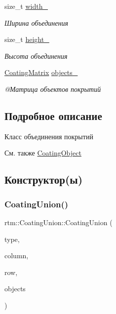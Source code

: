 \begin{DoxyCompactItemize}
size\+\_\+t \hyperlink{classrtm_1_1_coating_union_acab8ed30a66c786a3ac7d0edff914dbc}{width\+\_\+}
\begin{DoxyCompactList}\small\item\em Ширина объединения \end{DoxyCompactList}\item 
\mbox{\label{classrtm_1_1_coating_union_abd65484b95a4b62e1c22146cb2a9d542}} 
size\+\_\+t \hyperlink{classrtm_1_1_coating_union_abd65484b95a4b62e1c22146cb2a9d542}{height\+\_\+}
\begin{DoxyCompactList}\small\item\em Высота объединения \end{DoxyCompactList}\item 
\mbox{\label{classrtm_1_1_coating_union_a805afd44081afec9f4e286436be1a735}} 
\hyperlink{namespacertm_ae3bb29510cfde424975be31866d2486e}{Coating\+Matrix} \hyperlink{classrtm_1_1_coating_union_a805afd44081afec9f4e286436be1a735}{objects\+\_\+}
\begin{DoxyCompactList}\small\item\em @Матрица объектов покрытий \end{DoxyCompactList}\end{DoxyCompactItemize}


\subsection{Подробное описание}
Класс объединения покрытий \begin{DoxySeeAlso}{См. также}
\hyperlink{classrtm_1_1_coating_object}{Coating\+Object} 
\end{DoxySeeAlso}


\subsection{Конструктор(ы)}
\mbox{\label{classrtm_1_1_coating_union_ad5c97fb37269028e9058c37c10428255}} 
\subsubsection{\texorpdfstring{Coating\+Union()}{CoatingUnion()}}
{\footnotesize\ttfamily rtm\+::\+Coating\+Union\+::\+Coating\+Union (\begin{DoxyParamCaption}\item[{\hyperlink{namespacertm_a6a0d424be5696f64038e5e84a79cabfa}{Coating\+Union\+Type}}]{type,  }\item[{int}]{column,  }\item[{int}]{row,  }\item[{\hyperlink{namespacertm_ae3bb29510cfde424975be31866d2486e}{Coating\+Matrix} \&\&}]{objects }\end{DoxyParamCaption})}

